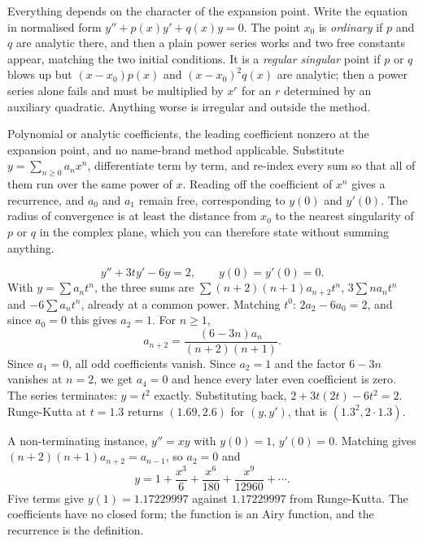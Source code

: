 Everything depends on the character of the expansion point. Write the equation in normalised form $y''+p(x)y'+q(x)y=0$. The point $x_0$ is \emph{ordinary} if $p$ and $q$ are analytic there, and then a plain power series works and two free constants appear, matching the two initial conditions. It is a \emph{regular singular} point if $p$ or $q$ blows up but $(x-x_0)p(x)$ and $(x-x_0)^{2}q(x)$ are analytic; then a power series alone fails and must be multiplied by $x^{r}$ for an $r$ determined by an auxiliary quadratic. Anything worse is irregular and outside the method.

\cue Polynomial or analytic coefficients, the leading coefficient nonzero at the expansion point, and no name-brand method applicable.
\method Substitute $y=\sum_{n\ge0}a_nx^{n}$, differentiate term by term, and re-index every sum so that all of them run over the same power of $x$. Reading off the coefficient of $x^{n}$ gives a recurrence, and $a_0$ and $a_1$ remain free, corresponding to $y(0)$ and $y'(0)$. The radius of convergence is at least the distance from $x_0$ to the nearest singularity of $p$ or $q$ in the complex plane, which you can therefore state without summing anything.

\begin{worked}
\[y''+3ty'-6y=2,\qquad y(0)=y'(0)=0.\]
With $y=\sum a_nt^{n}$, the three sums are $\sum(n+2)(n+1)a_{n+2}t^{n}$, $3\sum na_nt^{n}$ and $-6\sum a_nt^{n}$, already at a common power. Matching $t^{0}$: $2a_2-6a_0=2$, and since $a_0=0$ this gives $a_2=1$. For $n\ge1$,
\[a_{n+2}=\frac{(6-3n)a_n}{(n+2)(n+1)}.\]
Since $a_1=0$, all odd coefficients vanish. Since $a_2=1$ and the factor $6-3n$ vanishes at $n=2$, we get $a_4=0$ and hence every later even coefficient is zero. The series terminates: $y=t^{2}$ exactly. Substituting back, $2+3t(2t)-6t^{2}=2$. Runge-Kutta at $t=1.3$ returns $(1.69,2.6)$ for $(y,y')$, that is $(1.3^{2},2\cdot1.3)$.

A non-terminating instance, $y''=xy$ with $y(0)=1$, $y'(0)=0$. Matching gives $(n+2)(n+1)a_{n+2}=a_{n-1}$, so $a_2=0$ and
\[y=1+\frac{x^{3}}{6}+\frac{x^{6}}{180}+\frac{x^{9}}{12960}+\cdots.\]
Five terms give $y(1)=1.17229997$ against $1.17229997$ from Runge-Kutta. The coefficients have no closed form; the function is an Airy function, and the recurrence is the definition.
\end{worked}

